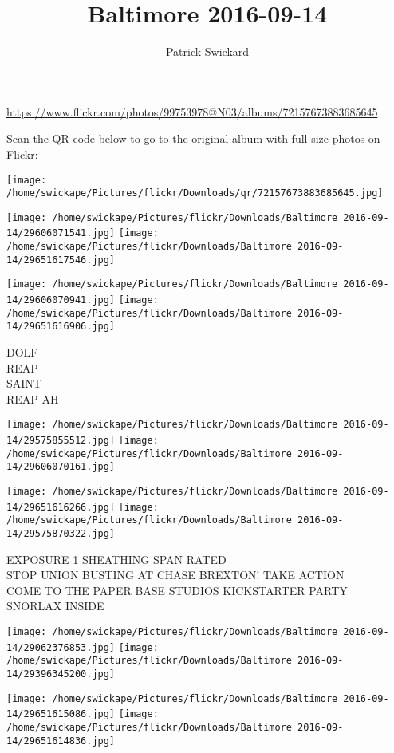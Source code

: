 \documentclass[10pt,letterpaper]{article}
\title{Baltimore 2016-09-14}
\author{Patrick Swickard}
\date{}
\begin{document}
\maketitle

\url{https://www.flickr.com/photos/99753978@N03/albums/72157673883685645}

Scan the QR code below to go to the original album with full-size photos on Flickr:

\texttt{[image: /home/swickape/Pictures/flickr/Downloads/qr/72157673883685645.jpg]}
\pagebreak

\texttt{[image: /home/swickape/Pictures/flickr/Downloads/Baltimore 2016-09-14/29606071541.jpg]}
\texttt{[image: /home/swickape/Pictures/flickr/Downloads/Baltimore 2016-09-14/29651617546.jpg]}

\texttt{[image: /home/swickape/Pictures/flickr/Downloads/Baltimore 2016-09-14/29606070941.jpg]}
\texttt{[image: /home/swickape/Pictures/flickr/Downloads/Baltimore 2016-09-14/29651616906.jpg]}

DOLF\\
REAP\\
SAINT\\
REAP AH
\pagebreak

\texttt{[image: /home/swickape/Pictures/flickr/Downloads/Baltimore 2016-09-14/29575855512.jpg]}
\texttt{[image: /home/swickape/Pictures/flickr/Downloads/Baltimore 2016-09-14/29606070161.jpg]}

\texttt{[image: /home/swickape/Pictures/flickr/Downloads/Baltimore 2016-09-14/29651616266.jpg]}
\texttt{[image: /home/swickape/Pictures/flickr/Downloads/Baltimore 2016-09-14/29575870322.jpg]}

EXPOSURE 1 SHEATHING SPAN RATED\\
STOP UNION BUSTING AT CHASE BREXTON!   TAKE ACTION\\
COME TO THE PAPER BASE STUDIOS KICKSTARTER PARTY\\
SNORLAX INSIDE
\pagebreak

\texttt{[image: /home/swickape/Pictures/flickr/Downloads/Baltimore 2016-09-14/29062376853.jpg]}
\texttt{[image: /home/swickape/Pictures/flickr/Downloads/Baltimore 2016-09-14/29396345200.jpg]}

\texttt{[image: /home/swickape/Pictures/flickr/Downloads/Baltimore 2016-09-14/29651615086.jpg]}
\texttt{[image: /home/swickape/Pictures/flickr/Downloads/Baltimore 2016-09-14/29651614836.jpg]}
\end{document}
